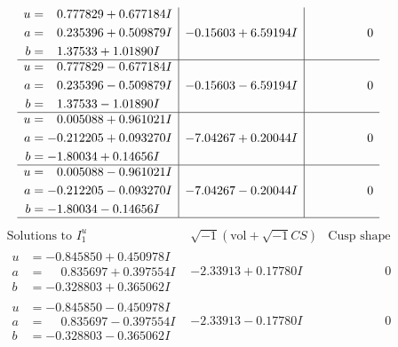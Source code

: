 \documentclass[1p]{elsarticle_modified}
\theoremstyle{definition}
\newcommand{\I}{\sqrt{-1}}
\begin{document}
$$\begin{array}{c|c|c}
\begin{aligned}
u &= \phantom{-}0.777829 + 0.677184 I \\
a &= \phantom{-}0.235396 + 0.509879 I \\
b &= \phantom{-}1.37533 + 1.01890 I\end{aligned}
 & -0.15603 + 6.59194 I & \phantom{-0.000000 } 0 \\ \hline\begin{aligned}
u &= \phantom{-}0.777829 - 0.677184 I \\
a &= \phantom{-}0.235396 - 0.509879 I \\
b &= \phantom{-}1.37533 - 1.01890 I\end{aligned}
 & -0.15603 - 6.59194 I & \phantom{-0.000000 } 0 \\ \hline\begin{aligned}
u &= \phantom{-}0.005088 + 0.961021 I \\
a &= -0.212205 + 0.093270 I \\
b &= -1.80034 + 0.14656 I\end{aligned}
 & -7.04267 + 0.20044 I & \phantom{-0.000000 } 0 \\ \hline\begin{aligned}
u &= \phantom{-}0.005088 - 0.961021 I \\
a &= -0.212205 - 0.093270 I \\
b &= -1.80034 - 0.14656 I\end{aligned}
 & -7.04267 - 0.20044 I & \phantom{-0.000000 } 0\\
 \hline 
 \end{array}$$\newpage$$\begin{array}{c|c|c}  
\text{Solutions to }I^u_{1}& \I (\text{vol} + \sqrt{-1}CS) & \text{Cusp shape}\\
 \hline 
\begin{aligned}
u &= -0.845850 + 0.450978 I \\
a &= \phantom{-}0.835697 + 0.397554 I \\
b &= -0.328803 + 0.365062 I\end{aligned}
 & -2.33913 + 0.17780 I & \phantom{-0.000000 } 0 \\ \hline\begin{aligned}
u &= -0.845850 - 0.450978 I \\
a &= \phantom{-}0.835697 - 0.397554 I \\
b &= -0.328803 - 0.365062 I\end{aligned}
 & -2.33913 - 0.17780 I & \phantom{-0.000000 } 0 \\ \hline\begin{aligned}

\end{aligned}
\end{array}$$
\end{document}
